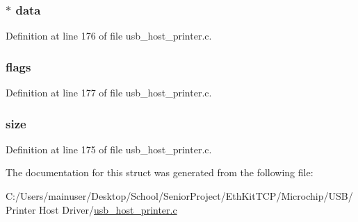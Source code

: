\subsubsection[{data}]{$\ast$ data}\label{struct___u_s_b___p_r_i_n_t_e_r___q_u_e_u_e___i_t_e_m_a3d1ef01c0aa6dd4984364db3f2d26fd2}


Definition at line 176 of file usb\+\_\+host\+\_\+printer.\+c.

\hypertarget{struct___u_s_b___p_r_i_n_t_e_r___q_u_e_u_e___i_t_e_m_aa0ae44a9b44573c1d0ba505e90b6b952}{}
\subsubsection[{flags}]{ flags}\label{struct___u_s_b___p_r_i_n_t_e_r___q_u_e_u_e___i_t_e_m_aa0ae44a9b44573c1d0ba505e90b6b952}


Definition at line 177 of file usb\+\_\+host\+\_\+printer.\+c.

\hypertarget{struct___u_s_b___p_r_i_n_t_e_r___q_u_e_u_e___i_t_e_m_adfdd3a80d1d8ea7918a6d1ebee518102}{}
\subsubsection[{size}]{ size}\label{struct___u_s_b___p_r_i_n_t_e_r___q_u_e_u_e___i_t_e_m_adfdd3a80d1d8ea7918a6d1ebee518102}


Definition at line 175 of file usb\+\_\+host\+\_\+printer.\+c.



The documentation for this struct was generated from the following file\+:\begin{DoxyCompactItemize}
\item 
C\+:/\+Users/mainuser/\+Desktop/\+School/\+Senior\+Project/\+Eth\+Kit\+T\+C\+P/\+Microchip/\+U\+S\+B/\+Printer Host Driver/\hyperlink{usb__host__printer_8c}{usb\+\_\+host\+\_\+printer.\+c}\end{DoxyCompactItemize}

